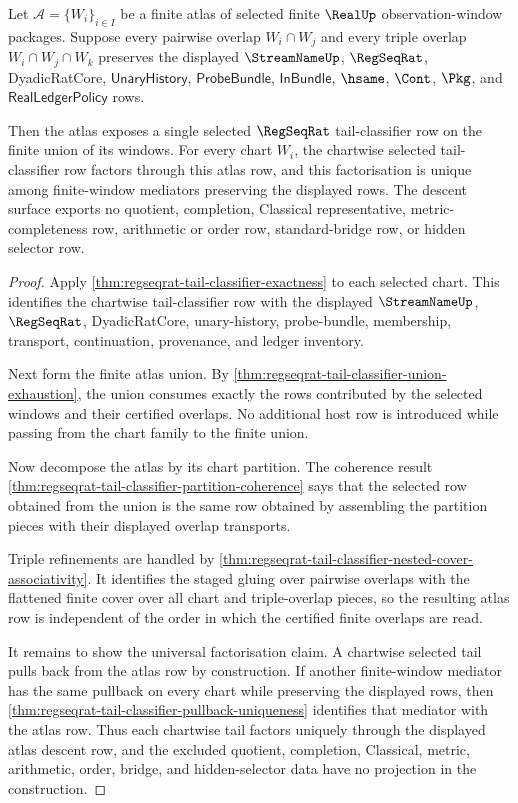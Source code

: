 \begin{theorem}
\label{thm:regseqrat-tail-classifier-atlas-descent}
Let $\mathcal{A}=\{W_i\}_{i\in I}$ be a finite atlas of selected finite
$\RealUp$ observation-window packages. Suppose every pairwise overlap
$W_i\cap W_j$ and every triple overlap $W_i\cap W_j\cap W_k$ preserves the
displayed $\StreamNameUp$, $\RegSeqRat$, DyadicRatCore,
$\mathsf{UnaryHistory}$, $\mathsf{ProbeBundle}$, $\mathsf{InBundle}$,
$\hsame$, $\Cont$, $\Pkg$, and $\mathsf{RealLedgerPolicy}$ rows.

Then the atlas exposes a single selected $\RegSeqRat$ tail-classifier row on
the finite union of its windows. For every chart $W_i$, the chartwise selected
tail-classifier row factors through this atlas row, and this factorisation is
unique among finite-window mediators preserving the displayed rows. The
descent surface exports no quotient, completion, Classical representative,
metric-completeness row, arithmetic or order row, standard-bridge row, or
hidden selector row.
\end{theorem}
\begin{proof}
Apply \autoref{thm:regseqrat-tail-classifier-exactness} to each selected chart.
This identifies the chartwise tail-classifier row with the displayed
$\StreamNameUp$, $\RegSeqRat$, DyadicRatCore, unary-history, probe-bundle,
membership, transport, continuation, provenance, and ledger inventory.

Next form the finite atlas union. By
\autoref{thm:regseqrat-tail-classifier-union-exhaustion}, the union consumes
exactly the rows contributed by the selected windows and their certified
overlaps. No additional host row is introduced while passing from the chart
family to the finite union.

Now decompose the atlas by its chart partition. The coherence result
\autoref{thm:regseqrat-tail-classifier-partition-coherence} says that the
selected row obtained from the union is the same row obtained by assembling the
partition pieces with their displayed overlap transports.

Triple refinements are handled by
\autoref{thm:regseqrat-tail-classifier-nested-cover-associativity}. It
identifies the staged gluing over pairwise overlaps with the flattened finite
cover over all chart and triple-overlap pieces, so the resulting atlas row is
independent of the order in which the certified finite overlaps are read.

It remains to show the universal factorisation claim. A chartwise selected
tail pulls back from the atlas row by construction. If another finite-window
mediator has the same pullback on every chart while preserving the displayed
rows, then
\autoref{thm:regseqrat-tail-classifier-pullback-uniqueness} identifies that
mediator with the atlas row. Thus each chartwise tail factors uniquely through
the displayed atlas descent row, and the excluded quotient, completion,
Classical, metric, arithmetic, order, bridge, and hidden-selector data have no
projection in the construction.
\end{proof}

